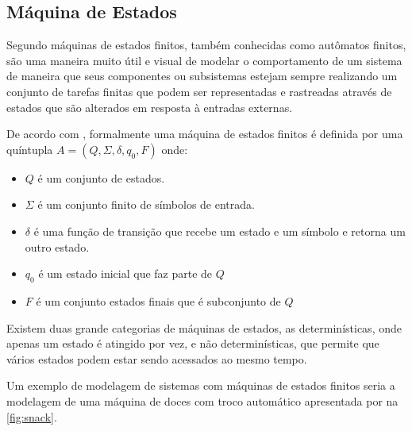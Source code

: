 



\subsection{Máquina de Estados}

Segundo  máquinas de estados finitos, também conhecidas como autômatos finitos, são uma maneira muito útil e visual de modelar o comportamento de um sistema de maneira que seus componentes ou subsistemas estejam sempre realizando um conjunto de tarefas finitas que podem ser representadas e rastreadas através de estados que são alterados em resposta à entradas externas. 

De acordo com , formalmente uma máquina de estados finitos é definida por uma quíntupla $A = (Q, \Sigma, \delta, q_0, F)$ onde:

\begin{itemize}
    \item $Q$ é um conjunto de estados.
    \item $\Sigma$ é um conjunto finito de símbolos de entrada.
    \item $\delta$ é uma função de transição que recebe um estado e um símbolo e retorna um outro estado.
    \item $q_0$ é um estado inicial que faz parte de $Q$
    \item $F$ é um conjunto estados finais que é subconjunto de $Q$ 
\end{itemize}

Existem duas grande categorias de máquinas de estados, as determinísticas, onde apenas um estado é atingido por vez, e não determinísticas, que permite que vários estados podem estar sendo acessados ao mesmo tempo. \cite{hopcroft:2001}

Um exemplo de modelagem de sistemas com máquinas de estados finitos seria a modelagem de uma máquina de doces com troco automático apresentada por \cite{snack} na \autoref{fig:snack}.

